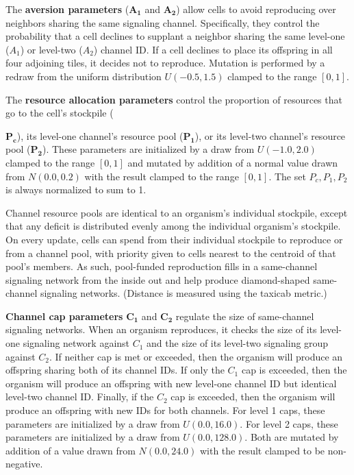 The \textbf{aversion parameters} ($\bm{A_1}$ and $\bm{A_2}$) allow cells to avoid reproducing over neighbors sharing the same signaling channel.
Specifically, they control the probability that a cell declines to supplant a neighbor sharing the same level-one ($A_1$) or level-two ($A_2$) channel ID.
If a cell declines to place its offspring in all four adjoining tiles, it decides not to reproduce.
Mutation is performed by a redraw from the uniform distribution $U(-0.5,1.5)$ clamped to the range $[0,1]$.

The \textbf{resource allocation parameters} control the proportion of resources that go to the cell's stockpile ({$\bm{P_{c}}$), its level-one channel's resource pool ($\bm{P_1}$), or its level-two channel's resource pool ($\bm{P_2}$).
These parameters are initialized by a draw from $U(-1.0, 2.0)$ clamped to the range $[0,1]$ and mutated by addition of a normal value drawn from $N(0.0,0.2)$ with the result clamped to the range $[0,1]$.
The set $P_{c}, P_1, P_2$ is always normalized to sum to 1.

Channel resource pools are identical to an organism's individual stockpile, except that any deficit is distributed evenly among the individual organism's stockpile.
On every update, cells can spend from their individual stockpile to reproduce or from a channel pool, with priority given to cells nearest to the centroid of that pool's members.
As such, pool-funded reproduction fills in a same-channel signaling network from the inside out and help produce diamond-shaped same-channel signaling networks.
(Distance is measured using the taxicab metric.)

\textbf{Channel cap parameters} $\bm{C_1}$ and $\bm{C_2}$ regulate the size of same-channel signaling networks.
When an organism reproduces, it checks the size of its level-one signaling network against $C_1$ and the size of its level-two signaling group against $C_2$.
If neither cap is met or exceeded, then the organism will produce an offspring sharing both of its channel IDs.
If only the $C_1$ cap is exceeded, then the organism will produce an offspring with new level-one channel ID but identical level-two channel ID.
Finally, if the $C_2$ cap is exceeded, then the organism will produce an offspring with new IDs for both channels.
For level 1 caps, these parameters are initialized by a draw from $U(0.0, 16.0)$.
For level 2 caps, these parameters are initialized by a draw from $U(0.0, 128.0)$.
Both are mutated by addition of a value drawn from $N(0.0,24.0)$ with the result clamped to be non-negative.

}
